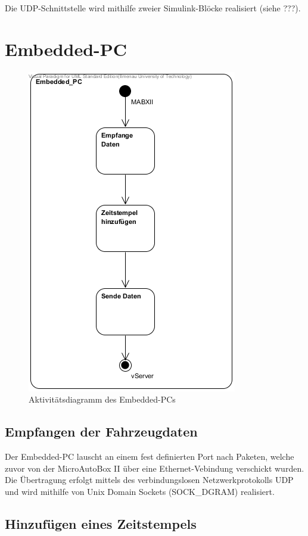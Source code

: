 \documentclass[fontsize = 12pt, paper = a4]{scrreprt}
\begin{document}
Die UDP-Schnittstelle wird mithilfe zweier Simulink-Blöcke realisiert (siehe ???). 

\section{Embedded-PC}

\begin{figure}[h]
\centering
\includegraphics[scale = 0.70]{activity_embedded_pc.png}
\caption{Aktivitätsdiagramm des Embedded-PCs}
\end{figure} 

\subsection{Empfangen der Fahrzeugdaten}

Der Embedded-PC lauscht an einem fest definierten Port nach Paketen, welche zuvor von der MicroAutoBox II über eine Ethernet-Vebindung verschickt wurden. Die Übertragung erfolgt mittels des verbindungslosen Netzwerkprotokolls UDP und wird mithilfe von Unix Domain Sockets (SOCK\_DGRAM) realisiert. 

\subsection{Hinzufügen eines Zeitstempels}
\end{document}
